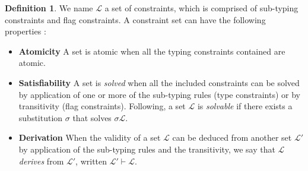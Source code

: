 \documentclass[9pt]{article}
\theoremstyle{plain}
\theoremstyle{definition}
\newtheorem{defn}{Definition}[subsection] %
\begin{document}
\begin{defn} We name $\mathcal{L}$ a set of constraints, which is comprised of sub-typing constraints
  and flag constraints. A constraint set can have the following properties :
  \begin{itemize}
  	\item[]{\bf Atomicity} A set is atomic when all the typing constraints contained are atomic.
  	\item[]{\bf Satisfiability} A set is \textit{solved} when all the included constraints can be solved by application of one or
  		more of the sub-typing rules (type constraints) or by transitivity (flag constraints).
  		Following, a set $\mathcal{L}$ is \textit{solvable} if there exists a substitution $\sigma$ that solves $\sigma \mathcal{L}$.
	 	\item[]{\bf Derivation} When the validity of a set $\mathcal{L}$ can be deduced from another set $\mathcal{L'}$ by application of
		  the sub-typing rules and the transitivity, we say that $\mathcal{L}$ \textit{derives} from $\mathcal{L'}$,
		  written $\mathcal{L'} \vdash \mathcal{L}$.
  \end{itemize}
\end{defn}
\end{document}

